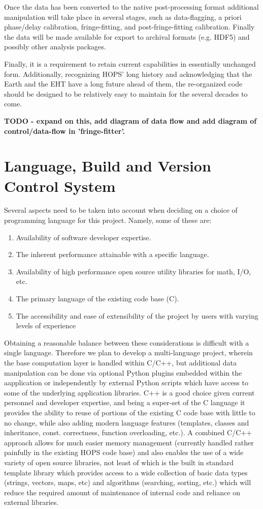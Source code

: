 \documentclass[hidelinks]{article}
\let\Oldsection\section
\renewcommand{\section}{\FloatBarrier\Oldsection}
\begin{document}
Once the data has been converted to the native post-processing format additional manipulation will take place in several stages, such as data-flagging, 
a priori phase/delay calibration, fringe-fitting, and post-fringe-fitting calibration. Finally the data will be made available for export to archival formats
(e.g. HDF5) and possibly other analysis packages.

Finally, it is a requirement to retain current capabilities in essentially unchanged form.  Additionally, recognizing HOPS' long history
and acknowledging that the Earth and the EHT have a long future ahead of them, the re-organized code should be designed to be relatively
easy to maintain for the several decades to come.

\textbf{TODO - expand on this, add diagram of data flow and add diagram of control/data-flow in 'fringe-fitter'.}

\section{Language, Build and Version Control System}

Several aspects need to be taken into account when deciding on a choice of programming language for this project. Namely, some of these are:
\begin{enumerate}
 \item Availability of software developer expertise.
 \item The inherent performance attainable with a specific language.
 \item Availability of high performance open source utility libraries for math, I/O, etc.
 \item The primary language of the existing code base (C).
 \item The accessibility and ease of extensibility of the project by users with varying levels of experience
\end{enumerate}

Obtaining a reasonable balance between these considerations is difficult with a single language. Therefore we
plan to develop a multi-language project, wherein the base computation layer is handled within C/C++,
but additional data manipulation can be done via optional Python plugins embedded within the aapplication
or independently by external Python scripts which have access to some of the underlying application libraries. 
C++ is a good choice given current personnel and developer expertise, and being a super-set of the C language
it provides the ability to reuse of portions of the existing C code base with little to no change, while also adding modern language features
(templates, classes and inheritance, const. correctness, function overloading, etc.). A combined C/C++ approach 
allows for much easier memory management (currently handled rather painfully in the existing HOPS code base) and also
enables the use of a wide variety of open source libraries, not least of which is the built in standard template library
which provides access to a wide collection of basic data types (strings, vectors, maps, etc) and algorithms (searching, sorting, etc.)
which will reduce the required amount of maintenance of internal code and reliance on external libraries. 
\end{document}
